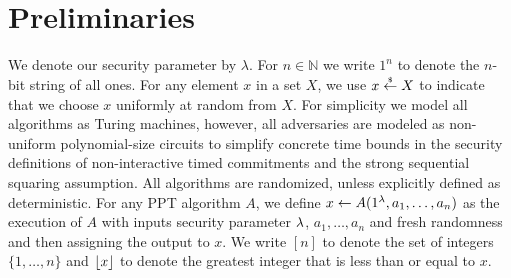 \section{Preliminaries}
We denote our security parameter by $\lambda$. For $n \in \mathbb{N}$ we write $1^n$ to denote the $n$-bit string of all ones. For any element $x$ in a set $X$, we use $x \stackrel{{\scriptscriptstyle\$}}{\leftarrow} X$ to indicate that we choose $x$ uniformly at random from $X$. For simplicity we model all algorithms as Turing machines, however, all adversaries are modeled as non-uniform polynomial-size circuits to simplify concrete time bounds in the security definitions of non-interactive timed commitments and the strong sequential squaring assumption. All algorithms are randomized, unless explicitly defined as deterministic. For any PPT algorithm $A$, we define $x \leftarrow A(1^{\lambda},a_1,\ldots,a_n)$ as the execution of $A$ with inputs security parameter $\lambda$, $a_1,\ldots,a_n$ and fresh randomness and then assigning the output to $x$. We write $[n]$ to denote the set of integers $\{1, \dots, n\}$ and $\left\lfloor x \right\rfloor$ to denote the greatest integer that is less than or equal to $x$.



